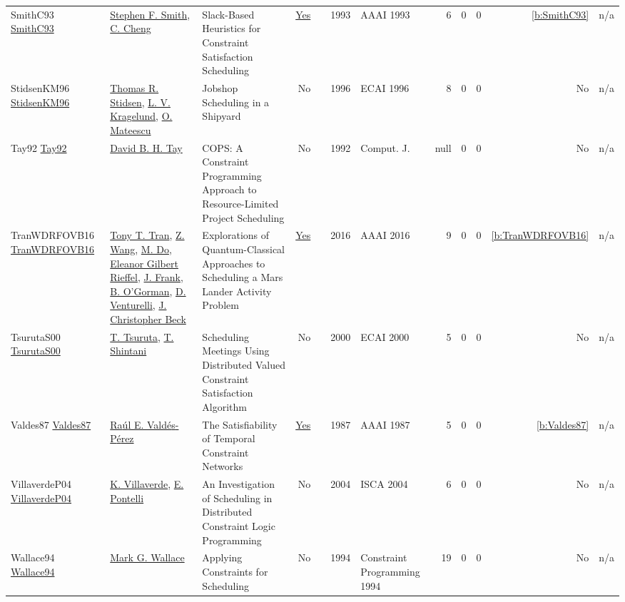 {\begin{longtable}{>{\raggedright\arraybackslash}p{3cm}>{\raggedright\arraybackslash}p{6cm}>{\raggedright\arraybackslash}p{6.5cm}rrrp{2.5cm}rrrrr}
SmithC93 \href{http://www.aaai.org/Library/AAAI/1993/aaai93-022.php}{SmithC93} & \hyperref[auth:a300]{Stephen F. Smith}, \hyperref[auth:a1300]{C. Cheng} & Slack-Based Heuristics for Constraint Satisfaction Scheduling & \href{../works/SmithC93.pdf}{Yes} & \cite{SmithC93} & 1993 & AAAI 1993 & 6 & 0 & 0 & \ref{b:SmithC93} & n/a\\
StidsenKM96 \href{}{StidsenKM96} & \hyperref[auth:a1285]{Thomas R. Stidsen}, \hyperref[auth:a1286]{L. V. Kragelund}, \hyperref[auth:a1287]{O. Mateescu} & Jobshop Scheduling in a Shipyard & No & \cite{StidsenKM96} & 1996 & ECAI 1996 & 8 & 0 & 0 & No & n/a\\
Tay92 \href{}{Tay92} & \hyperref[auth:a707]{David B. H. Tay} & {COPS:} {A} Constraint Programming Approach to Resource-Limited Project Scheduling & No & \cite{Tay92} & 1992 & Comput. J. & null & 0 & 0 & No & n/a\\
TranWDRFOVB16 \href{http://www.aaai.org/ocs/index.php/WS/AAAIW16/paper/view/12664}{TranWDRFOVB16} & \hyperref[auth:a805]{Tony T. Tran}, \hyperref[auth:a814]{Z. Wang}, \hyperref[auth:a815]{M. Do}, \hyperref[auth:a816]{Eleanor Gilbert Rieffel}, \hyperref[auth:a382]{J. Frank}, \hyperref[auth:a817]{B. O'Gorman}, \hyperref[auth:a818]{D. Venturelli}, \hyperref[auth:a89]{J. Christopher Beck} & Explorations of Quantum-Classical Approaches to Scheduling a Mars Lander Activity Problem & \href{../works/TranWDRFOVB16.pdf}{Yes} & \cite{TranWDRFOVB16} & 2016 & AAAI 2016 & 9 & 0 & 0 & \ref{b:TranWDRFOVB16} & n/a\\
TsurutaS00 \href{}{TsurutaS00} & \hyperref[auth:a1290]{T. Tsuruta}, \hyperref[auth:a1291]{T. Shintani} & Scheduling Meetings Using Distributed Valued Constraint Satisfaction Algorithm & No & \cite{TsurutaS00} & 2000 & ECAI 2000 & 5 & 0 & 0 & No & n/a\\
Valdes87 \href{http://www.aaai.org/Library/AAAI/1987/aaai87-046.php}{Valdes87} & \hyperref[auth:a1296]{Ra{\'{u}}l E. Vald{\'{e}}s{-}P{\'{e}}rez} & The Satisfiability of Temporal Constraint Networks & \href{../works/Valdes87.pdf}{Yes} & \cite{Valdes87} & 1987 & AAAI 1987 & 5 & 0 & 0 & \ref{b:Valdes87} & n/a\\
VillaverdeP04 \href{}{VillaverdeP04} & \hyperref[auth:a664]{K. Villaverde}, \hyperref[auth:a33]{E. Pontelli} & An Investigation of Scheduling in Distributed Constraint Logic Programming & No & \cite{VillaverdeP04} & 2004 & ISCA 2004 & 6 & 0 & 0 & No & n/a\\
Wallace94 \href{}{Wallace94} & \hyperref[auth:a117]{Mark G. Wallace} & Applying Constraints for Scheduling & No & \cite{Wallace94} & 1994 & Constraint Programming 1994 & 19 & 0 & 0 & No & n/a\\

\end{longtable}}

